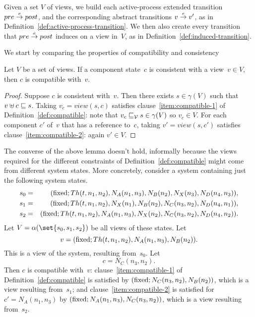 \begin{definition}
\label{def:abstract-transition}
Given a set $V$ of views, we build each active-process extended transition
$pre \stackrel{e}\rightarrow post$, and the corresponding abstract transitions $v \stackrel{e}\rightarrow
v'$, as in Definition~\ref{def:active-process-transition}.
%
We then also create every transition that $pre \stackrel{e}\rightarrow post$ induces on a
view in~$V$, as in Definition~\ref{def:induced-transition}. 
\end{definition}

We start by comparing the properties of compatibility and consistency
%
\begin{lemma}
\label{lem:consistent-implies-compatible}
Let $V$ be a set of views.
If a component state~$c$ is consistent with a view~$v \in V$, then
$c$ is compatible with~$v$. 
\end{lemma}
%
\begin{proof}
Suppose $c$ is consistent with~$v$.  Then there exists $s \in \gamma(V)$ such
that $v \uplus c \sqsubseteq s$.  Taking $v_c = view(s, c)$ satisfies
clause~\ref{item:compatible-1} of Definition~\ref{def:compatible}: note that
$v_c \sqsubseteq_{\mathcal{V}} s \in \gamma(V)$ so $v_c \in V$.  For each component $c'$ of~$v$
that has a reference to~$c$, taking $v' = view(s,c')$ satisfies
clause~\ref{item:compatible-2}: again $v' \in V$.
\end{proof}

The converse of the above lemma doesn't hold, informally because the views
required for the different constraints of Definition~\ref{def:compatible}
might come from different system states.  More concretely, consider a system
containing just the following system states.
%
\begin{eqnarray*}
s_0 & = &
   (\mathrm{fixed}; Th(t,n_1,n_2), N_A(n_1,n_3), N_B(n_2), N_X(n_3), N_D(n_4,n_3)), \\
s_1 & = &
  (\mathrm{fixed}; Th(t,n_1,n_2), N_X(n_1), N_B(n_2), N_C(n_3,n_2), N_D(n_4,n_1)),\\
s_2 & = & 
  (\mathrm{fixed}; Th(t,n_1,n_2), N_A(n_1,n_3), N_X(n_2), N_C(n_3,n_2), N_D(n_4,n_2)).
\end{eqnarray*}
%
Let $V = \alpha(\set{s_0,s_1,s_2})$ be all views of these states.  Let
\[
v = (\mathrm{fixed}; Th(t,n_1,n_2), N_A(n_1, n_3), N_B(n_2)).
\]
This is a view of the system, resulting from~$s_0$.  Let 
\[
c = N_C(n_3,n_2).
\]  
Then  $c$ is compatible with~$v$:
%
clause~\ref{item:compatible-1} of Definition~\ref{def:compatible} is satisfied
by $(\mathrm{fixed}; N_C(n_3,n_2), N_B(n_2))$, which is a view resulting
from~$s_1$;
%
and clause~\ref{item:compatible-2} is satisfied for $c' = N_A(n_1,n_3)$ by
$(\mathrm{fixed}; N_A(n_1, n_3), N_C(n_3,n_2))$, which is a view resulting
from~$s_2$. 


